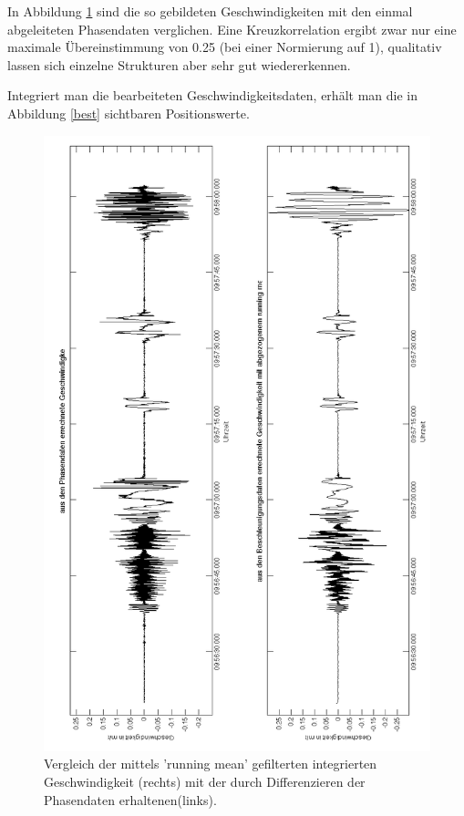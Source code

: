 \documentclass[12pt,a4paper,twoside,BCOR=12.5mm]{scrartcl}
\begin{document}
In Abbildung \ref{compare_v} sind die so gebildeten Geschwindigkeiten mit den einmal abgeleiteten Phasendaten verglichen.
Eine Kreuzkorrelation ergibt zwar nur eine maximale Übereinstimmung von 0.25 (bei einer Normierung auf 1), qualitativ lassen sich einzelne Strukturen aber sehr gut wiedererkennen.

Integriert man die bearbeiteten Geschwindigkeitsdaten, erhält man die in Abbildung \ref{best} sichtbaren Positionswerte.\\

 \begin{figure}[htb]
\centering
\includegraphics[scale=.40]{geoauswertung/compare_v.png}
\caption{Vergleich der mittels 'running mean' gefilterten integrierten Geschwindigkeit (rechts) mit der durch Differenzieren der Phasendaten erhaltenen(links).}
\label{compare_v}
\end{figure}
\end{document}
